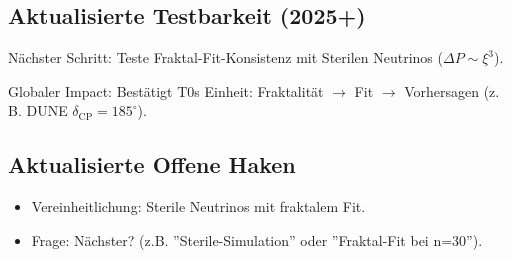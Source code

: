 	\subsection{Aktualisierte Testbarkeit (2025+)}
	
	Nächster Schritt: Teste Fraktal-Fit-Konsistenz mit Sterilen Neutrinos ($\Delta P \sim \xi^3$).
	
	Globaler Impact: Bestätigt T0s Einheit: Fraktalität $\to$ Fit $\to$ Vorhersagen (z. B. DUNE $\delta_\text{CP}=185^\circ$).
	
	\subsection{Aktualisierte Offene Haken}
	
	\begin{itemize}
		\item Vereinheitlichung: Sterile Neutrinos mit fraktalem Fit.
		\item Frage: Nächster? (z.B. ''Sterile-Simulation'' oder ''Fraktal-Fit bei n=30'').
	\end{itemize}
	